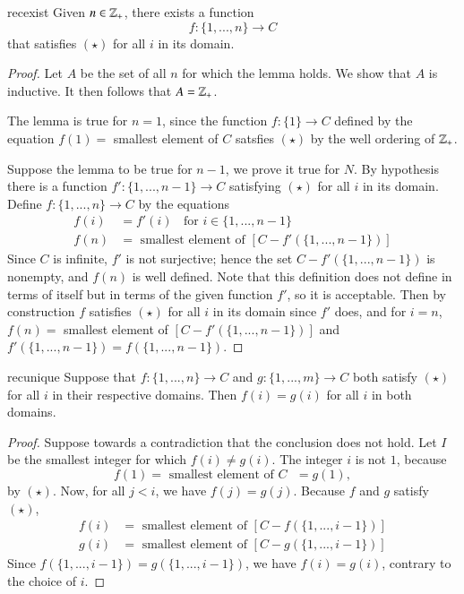 \documentclass[12pt, a4paper, oneside, openright, titlepage]{book}
\begin{document}
\begin{appendices}
    \begin{lemma}{}{recexist}
        Given $n \in \mathbb Z_+$, there exists a function \begin{equation*}
            f:\{1,...,n\}\rightarrow C
        \end{equation*}
        that satisfies $(\star)$ for all $i$ in its domain.
    \end{lemma}
    \begin{proof}
        Let $A$ be the set of all $n$ for which the lemma holds. We show that $A$ is inductive. It then follows that $A = \mathbb Z_+$.


        The lemma is true for $n=1$, since the function $f:\{1\}\rightarrow C$ defined by the equation $f(1) = $ smallest element of $C$ satsfies $(\star)$ by the well ordering of $\mathbb Z_+$.

        Suppose the lemma to be true for $n-1$, we prove it true for $N$. By hypothesis there is a function $f':\{1,...,n-1\}\rightarrow C$ satisfying $(\star)$ for all $i$ in its domain. Define $f:\{1,...,n\}\rightarrow C$ by the equations \begin{align*}
            f(i) &= f'(i)\;\;\text{ for } i\in\{1,...,n-1\} \\
            f(n) &= \text{ smallest element of } [C-f'(\{1,...,n-1\})]
        \end{align*}
        Since $C$ is infinite, $f'$ is not surjective; hence the set $C-f'(\{1,...,n-1\})$ is nonempty, and $f(n)$ is well defined. Note that this definition does not define in terms of itself but in terms of the given function $f'$, so it is acceptable. Then by construction $f$ satisfies $(\star)$ for all $i$ in its domain since $f'$ does, and for $i = n$, $f(n) = $ smallest element of $[C-f'(\{1,...,n-1\})]$ and $f'(\{1,...,n-1\}) = f(\{1,...,n-1\})$.
    \end{proof}

    \begin{lemma}{}{recunique}
        Suppose that $f:\{1,...,n\}\rightarrow C$ and $g:\{1,...,m\}\rightarrow C$ both satisfy $(\star)$ for all $i$ in their respective domains. Then $f(i) = g(i)$ for all $i$ in both domains.
    \end{lemma}
    \begin{proof}
        Suppose towards a contradiction that the conclusion does not hold. Let $I$ be the smallest integer for which $f(i) \neq g(i)$. The integer $i$ is not $1$, because \begin{equation*}
            f(1) = \text{ smallest element of $C$ } = g(1),
        \end{equation*}
        by $(\star)$. Now, for all $j < i$, we have $f(j) = g(j)$. Because $f$ and $g$ satisfy $(\star)$, \begin{align*}
            f(i) &= \text{ smallest element of } [C-f(\{1,...,i-1\})] \\
            g(i) &= \text{ smallest element of } [C-g(\{1,...,i-1\})]
        \end{align*}
        Since $f(\{1,...,i-1\}) = g(\{1,...,i-1\})$, we have $f(i) = g(i)$, contrary to the choice of $i$.
    \end{proof}



\end{appendices}
\end{document}
